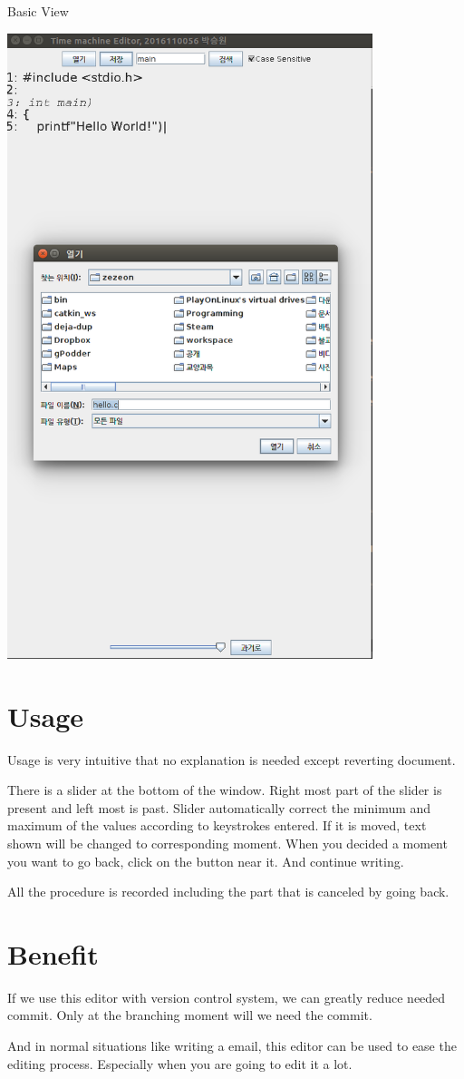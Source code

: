 \documentclass[12pt,a4paper]{article}
\begin{document}
\newpage
Basic View

\includegraphics[width=0.8\textwidth]{1.png}

\section{Usage}
Usage is very intuitive that no explanation is needed except reverting document.

There is a slider at the bottom of the window.
Right most part of the slider is present and left most is past.
Slider automatically correct the minimum and maximum of the values according to keystrokes entered.
If it is moved, text shown will be changed to corresponding moment.
When you decided a moment you want to go back, click on the button near it.
And continue writing.

All the procedure is recorded including the part that is canceled by going back.

\section{Benefit}
If we use this editor with version control system, we can greatly reduce needed commit. Only at the branching moment will we need the commit.

And in normal situations like writing a email, this editor can be used to ease the editing process. Especially when you are going to edit it a lot.
\end{document}
